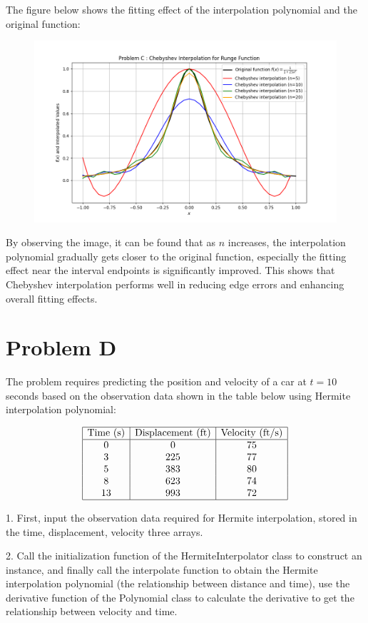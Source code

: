 \documentclass[a4paper]{article}
\begin{document}
The figure below shows the fitting effect of the interpolation polynomial and the original function:
\begin{figure}[h]
    \centering
    \includegraphics[width=0.75\linewidth]{Pictures/ProblemC_figure.png}
    \label{fig:enter-label}
\end{figure}

By observing the image, it can be found that as \( n \) increases, the interpolation polynomial gradually gets closer to the original function, especially the fitting effect near the interval endpoints is significantly improved. This shows that Chebyshev interpolation performs well in reducing edge errors and enhancing overall fitting effects.

\newpage
\section*{Problem D}

The problem requires predicting the position and velocity of a car at \( t = 10 \) seconds based on the observation data shown in the table below using Hermite interpolation polynomial:

\[
\begin{array}{|c|c|c|}
\hline
\text{Time (s)} & \text{Displacement (ft)} & \text{Velocity (ft/s)} \\
\hline
0 & 0 & 75 \\
3 & 225 & 77 \\
5 & 383 & 80 \\
8 & 623 & 74 \\
13 & 993 & 72 \\
\hline
\end{array}
\]

1. First, input the observation data required for Hermite interpolation, stored in the time, displacement, velocity three arrays.

2. Call the initialization function of the HermiteInterpolator class to construct an instance, and finally call the interpolate function to obtain the Hermite interpolation polynomial (the relationship between distance and time), use the derivative function of the Polynomial class to calculate the derivative to get the relationship between velocity and time.
\end{document}
